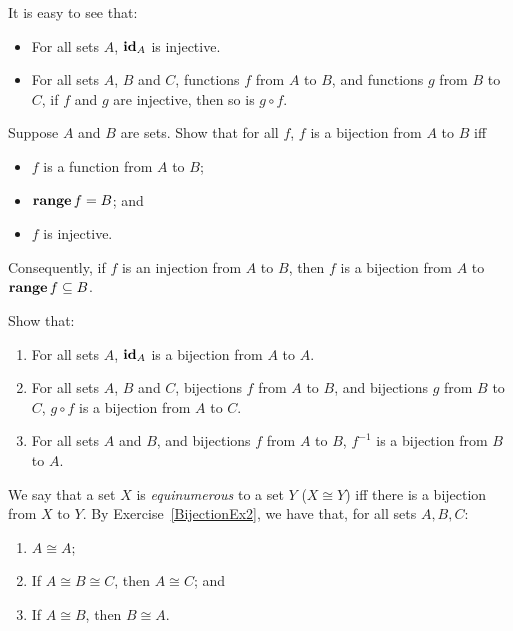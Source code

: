 It is easy to see that:
\begin{itemize}
\item For all sets $A$, $\mathbf{id}_A$ is injective.

\item For all sets $A$, $B$ and $C$, functions $f$ from $A$ to $B$,
and functions $g$ from $B$ to $C$, if $f$ and $g$ are injective,
then so is $g\circ f$.
\end{itemize}

\begin{exercise}
\label{BijectionEx1}
Suppose $A$ and $B$ are sets.  Show that for all $f$,
$f$ is a bijection from $A$ to $B$ iff
\begin{itemize}
\item $f$ is a function from $A$ to $B$;

\item $\mathbf{range}\,f = B$; and

\item $f$ is injective.
\end{itemize}
\end{exercise}

Consequently, if $f$ is an injection from $A$ to $B$, then $f$ is
a bijection from $A$ to $\mathbf{range}\,f\subseteq B$.

\begin{exercise}
\label{BijectionEx2}
Show that:
\begin{enumerate}[\quad(1)]
\item For all sets $A$, $\mathbf{id}_A$ is a bijection from $A$ to $A$.

\item For all sets $A$, $B$ and $C$, bijections $f$ from $A$ to $B$,
and bijections $g$ from $B$ to $C$, $g\circ f$ is a bijection from $A$ to $C$.

\item For all sets $A$ and $B$, and bijections $f$ from $A$ to $B$,
$f^{-1}$ is a bijection from $B$ to $A$.
\end{enumerate}
\end{exercise}

We say that a set $X$ is \emph{equinumerous} to a set $Y$
%
%
($X\cong Y$)
%
%
iff there is a bijection from $X$ to $Y$.  By Exercise~\ref{BijectionEx2},
we have that, for all sets $A,B,C$:
\begin{enumerate}[\quad (1)]
\item $A\cong A$;

\item If $A\cong B\cong C$, then $A\cong C$; and

\item If $A\cong B$, then $B\cong A$.
\end{enumerate}

